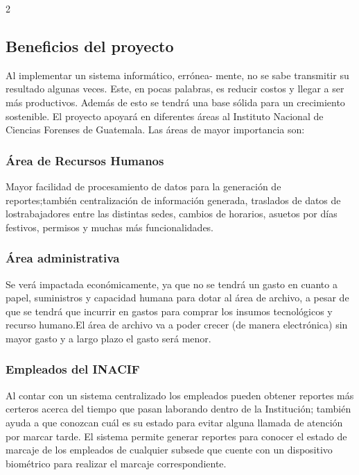 \documentclass[12pt,spanish,Letterpaper,openany]{book}
\begin{document}
\begin {multicols}{2}

\hypertarget{beneficios-del-proyecto}{%
\subsection{Beneficios del proyecto}\label{beneficios-del-proyecto}}

Al implementar un sistema informático, errónea-
mente, no se sabe transmitir su resultado algunas veces. Este, en pocas palabras, es reducir costos y llegar a ser más productivos. Además de esto se tendrá una base sólida para un crecimiento sostenible. El proyecto apoyará en diferentes áreas al Instituto Nacional de Ciencias Forenses de Guatemala.
Las áreas de mayor importancia son:

\hypertarget{uxe1rea-de-recursos-humanos}{%
\subsubsection{Área de Recursos Humanos}\label{uxe1rea-de-recursos-humanos}}

Mayor facilidad de procesamiento de datos para la generación de reportes;también centralización de información generada, traslados de datos de lostrabajadores entre las distintas sedes, cambios de horarios, asuetos por días festivos, permisos y muchas más funcionalidades.

\hypertarget{uxe1rea-administrativa}{%
\subsubsection{Área administrativa}\label{uxe1rea-administrativa}}

Se verá impactada económicamente, ya que no se tendrá un gasto en cuanto a papel, suministros y capacidad humana para dotar al área de archivo, a pesar de que se tendrá que incurrir en gastos para comprar los insumos tecnológicos y recurso humano.El área de archivo va a poder crecer (de manera electrónica) sin mayor gasto y a largo plazo el gasto será menor.

\hypertarget{empleados-del-inacif}{%
\subsubsection{Empleados del INACIF}\label{empleados-del-inacif}}

Al contar con un sistema centralizado los empleados pueden obtener reportes más certeros acerca del tiempo que pasan laborando dentro de la Institución; también ayuda a que conozcan cuál es su estado para evitar alguna llamada de atención por marcar tarde. El sistema permite generar reportes para conocer el estado de marcaje de los empleados de cualquier subsede que cuente con un dispositivo biométrico para realizar el marcaje correspondiente.


\end{multicols}
\end{document}
